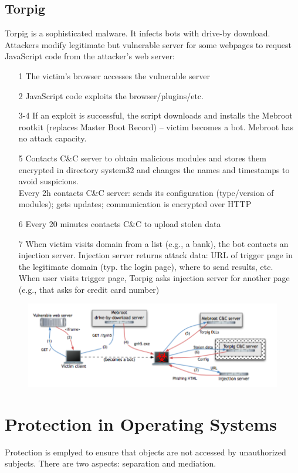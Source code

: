 \documentclass[10pt,a4paper]{report}
\begin{document}
\subsection{Torpig}
Torpig is a sophisticated malware. It infects bots with drive-by download. Attackers modify legitimate but vulnerable server for some webpages to request JavaScript code from the attacker’s web server:
\begin{itemize}
\item[1] The victim’s browser accesses the vulnerable server
\item[2] JavaScript code exploits the browser/plugins/etc.
\item[3-4] If an exploit is successful, the script downloads and installs the Mebroot rootkit
(replaces Master Boot Record) – victim becomes a bot. Mebroot has no attack capacity.
\item[5] Contacts C\&C server to obtain malicious modules and stores them encrypted in directory system32 and changes the names and timestamps to avoid suspicions.\\
Every 2h contacts C\&C server: sends its configuration (type/version of modules); gets updates; communication is encrypted over HTTP
\item[6] Every 20 minutes contacts C\&C to upload stolen data
\item[7] When victim visits domain from a list (e.g., a bank), the bot contacts an injection server. Injection server returns attack data: URL of trigger page in the legitimate domain (typ. the login page), where to send results, etc.\\
When user visits trigger page, Torpig asks injection server for another page (e.g., that asks for credit card number)
\end{itemize}
\begin{figure}[H]
\centering
\includegraphics[scale=0.5]{2.png}
\end{figure}
\section{Protection in Operating Systems}
Protection is emplyed to ensure that objects are not accessed by unauthorized subjects. There are two aspects: separation and mediation.
\end{document}
